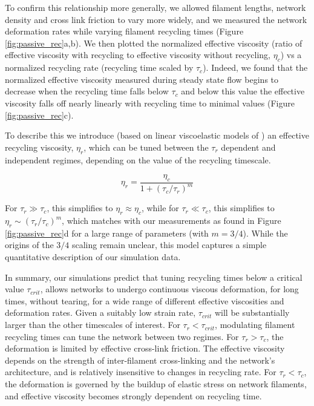 \documentclass[10pt,letterpaper]{article}
\begin{document}
To confirm this relationship more generally, we allowed filament lengths, network density and cross link friction to vary more widely, and we measured the network deformation rates while varying filament recycling times (Figure \ref{fig:passive_rec}a,b). We then plotted the normalized effective viscosity (ratio of effective viscosity with recycling to effective viscosity without recycling, $\eta_c$) vs a normalized recycling rate (recycling time scaled by $\tau_c$). Indeed, we found that the normalized effective viscosity measured during steady state flow begins to decrease when the recycling time falls below $\tau_c$ and below this value the effective viscosity falls off nearly linearly with recycling time to minimal values (Figure \ref{fig:passive_rec}c). 

To describe this we introduce (based on linear viscoelastic models of \cite{mccrum1997principles}) an effective recycling viscosity, $\eta_r$, which can be tuned between the $\tau_r$ dependent and independent regimes, depending on the value of the recycling timescale.



\begin{equation}
\label{eqn:simple_eta}
\eta_r = \frac{\eta_c}{1+(\tau_c/\tau_r)^m}  
\end{equation}

For $\tau_r\gg\tau_c$, this simplifies to $\eta_r\approx\eta_c$, while for $\tau_r\ll\tau_c$, this simplifies to $\eta_r\sim(\tau_r/\tau_c)^m$, which matches with our measurements as found in Figure \ref{fig:passive_rec}d for a large range of parameters (with $m=3/4$). While the origins of the $3/4$ scaling remain unclear, this model captures a simple quantitative description of our simulation data.



In summary, our simulations predict that tuning recycling times below a critical value $\tau_{crit}$, allows networks to undergo continuous viscous deformation, for long times, without tearing, for a wide range of different effective viscosities and deformation rates. Given a suitably low strain rate, $\tau_{crit}$ will be substantially larger than the other timescales of interest. For $\tau_r < \tau_{crit}$, modulating filament recycling times can tune the network between two regimes. For $\tau_r > \tau_c$, the deformation is limited by effective cross-link friction. The effective viscosity depends on the strength of inter-filament cross-linking and the network's architecture, and is relatively insensitive to changes in recycling rate. For $\tau_r < \tau_c$, the deformation is governed by the buildup of elastic stress on network filaments, and effective viscosity becomes strongly dependent on recycling time. 
\end{document}
